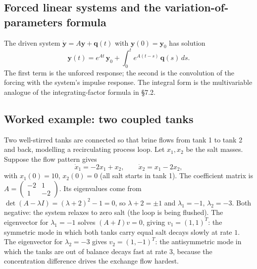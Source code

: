 \subsection{Forced linear systems and the variation-of-parameters formula}

The driven system $\dot{\mathbf{y}} = A \mathbf{y} + \mathbf{q}(t)$
with $\mathbf{y}(0) = \mathbf{y}_{0}$ has solution
\[
\mathbf{y}(t) = e^{A t}\, \mathbf{y}_{0} + \int_{0}^{t} e^{A (t - s)}\, \mathbf{q}(s)\,ds.
\]
The first term is the unforced response; the second is the
convolution of the forcing with the system's impulse response. The
integral form is the multivariable analogue of the integrating-factor
formula in §7.2.

\subsection{Worked example: two coupled tanks}

Two well-stirred tanks are connected so that brine flows from tank 1
to tank 2 and back, modelling a recirculating process loop. Let
$x_{1}, x_{2}$ be the salt masses. Suppose the flow pattern gives
\[
\dot{x}_{1} = -2 x_{1} + x_{2}, \qquad \dot{x}_{2} = x_{1} - 2 x_{2},
\]
with $x_{1}(0) = 10$, $x_{2}(0) = 0$ (all salt starts in tank 1).
The coefficient matrix is $A = \begin{pmatrix} -2 & 1 \\ 1 & -2
\end{pmatrix}$. Its eigenvalues come from $\det(A - \lambda I) =
(\lambda + 2)^{2} - 1 = 0$, so $\lambda + 2 = \pm 1$ and
$\lambda_{1} = -1$, $\lambda_{2} = -3$. Both negative: the system
relaxes to zero salt (the loop is being flushed). The eigenvector for
$\lambda_{1} = -1$ solves $(A + I)v = 0$, giving $v_{1} = (1, 1)^{T}$:
the symmetric mode in which both tanks carry equal salt decays slowly
at rate $1$. The eigenvector for $\lambda_{2} = -3$ gives
$v_{2} = (1, -1)^{T}$: the antisymmetric mode in which the tanks are
out of balance decays fast at rate $3$, because the concentration
difference drives the exchange flow hardest.

